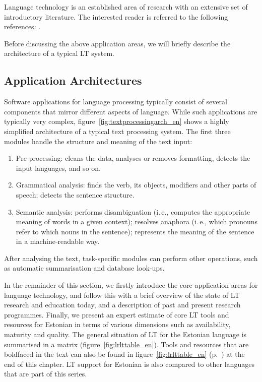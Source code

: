 \documentclass[]{../metanetpaper}
\begin{document}
\begin{multicols}{2}
Language technology is an established area of research with an extensive set of introductory literature. The interested reader is referred to the following references:  \cite{carstensen-etal1, jurafsky-martin01, manning-schuetze1, lt-world1, lt-survey1}.

Before discussing the above application areas, we will briefly describe the architecture of a typical LT system.

\subsection{Application Architectures}

Software applications for language processing typically consist of several components that mirror different aspects of language. While such applications are typically very complex, figure~\ref{fig:textprocessingarch_en} shows a highly simplified architecture of a typical text processing system. The first three modules handle the structure and meaning of the text input:

\begin{enumerate}
\item Pre-processing: cleans the data, analyses or removes formatting, detects the input languages, and so on.
\item Grammatical analysis: finds the verb, its objects, modifiers and other parts of speech; detects the sentence structure.
\item Semantic analysis: performs disambiguation (i.\,e., computes the appropriate meaning of words in a given context); resolves anaphora (i.\,e., which pronouns refer to which nouns in the sentence); represents the meaning of the sentence in a machine-readable way.
\end{enumerate}

After analysing the text, task-specific modules can perform other operations, such as automatic summarisation and database look-ups.

In the remainder of this section, we firstly introduce the core application areas for language technology, and follow this with a brief overview of the state of LT research and education today, and a description of past and present research programmes. Finally, we present an expert estimate of core LT tools and resources for Estonian in terms of various dimensions such as availability, maturity and quality. The general situation of LT for the Estonian language is summarised in a matrix (figure~\ref{fig:lrlttable_en}). Tools and resources that are boldfaced in the text can also be found in figure~\ref{fig:lrlttable_en} (p.~\pageref{fig:lrlttable_en}) at the end of this chapter. LT support for Estonian is also compared to other languages that are part of this series.


\end{multicols}
\end{document}
